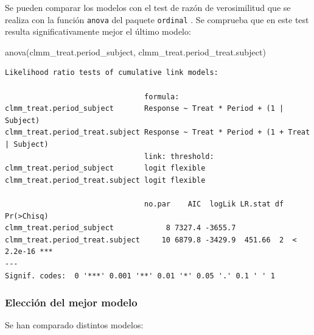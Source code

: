 \documentclass[
  12pt,
  a4paper,
  extrafontsizes,
  onecolumn,
  openright,
  table]{memoir}
\newenvironment{Shaded}{\begin{snugshade}}{\end{snugshade}}
\newcommand{\FunctionTok}[1]{\textcolor[rgb]{0.28,0.35,0.67}{#1}}
\newcommand{\NormalTok}[1]{\textcolor[rgb]{0.00,0.23,0.31}{#1}}
\begin{document}
Se pueden comparar los modelos con el test de razón de verosimilitud que
se realiza con la función \texttt{anova} del paquete \texttt{ordinal}
\autocite[ver][]{ordinalR}. Se comprueba que en este test resulta
significativamente mejor el último modelo:

\scriptsize

\begin{Shaded}
\begin{Highlighting}[]
\FunctionTok{anova}\NormalTok{(clmm\_treat.period\_subject, clmm\_treat.period\_treat.subject)}
\end{Highlighting}
\end{Shaded}

\begin{verbatim}
Likelihood ratio tests of cumulative link models:
 
                                formula:                                         
clmm_treat.period_subject       Response ~ Treat * Period + (1 | Subject)        
clmm_treat.period_treat.subject Response ~ Treat * Period + (1 + Treat | Subject)
                                link: threshold:
clmm_treat.period_subject       logit flexible  
clmm_treat.period_treat.subject logit flexible  

                                no.par    AIC  logLik LR.stat df Pr(>Chisq)    
clmm_treat.period_subject            8 7327.4 -3655.7                          
clmm_treat.period_treat.subject     10 6879.8 -3429.9  451.66  2  < 2.2e-16 ***
---
Signif. codes:  0 '***' 0.001 '**' 0.01 '*' 0.05 '.' 0.1 ' ' 1
\end{verbatim}

\normalsize

\hypertarget{elecciuxf3n-del-mejor-modelo}{%
\subsubsection{Elección del mejor
modelo}\label{elecciuxf3n-del-mejor-modelo}}

Se han comparado distintos modelos:
\end{document}
